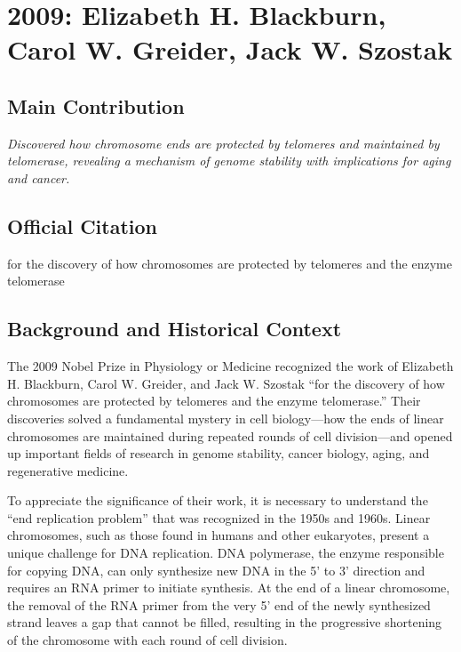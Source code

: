 \chapter[2009 --- Blackburn et al.]{2009: Elizabeth H. Blackburn, Carol W. Greider, Jack W. Szostak}
\label{ch:2009_Blackburn}

\section*{Main Contribution}

\textit{Discovered how chromosome ends are protected by telomeres and maintained by telomerase, revealing a mechanism of genome stability with implications for aging and cancer.}\cite{nobel-2009,lecture-2009}

\section{Official Citation}

for the discovery of how chromosomes are protected by telomeres and the enzyme telomerase

\section{Background and Historical Context}

The 2009 Nobel Prize in Physiology or Medicine recognized the work of Elizabeth H. Blackburn, Carol W. Greider, and Jack W. Szostak ``for the discovery of how chromosomes are protected by telomeres and the enzyme telomerase.'' Their discoveries solved a fundamental mystery in cell biology---how the ends of linear chromosomes are maintained during repeated rounds of cell division---and opened up important fields of research in genome stability, cancer biology, aging, and regenerative medicine.

To appreciate the significance of their work, it is necessary to understand the ``end replication problem'' that was recognized in the 1950s and 1960s. Linear chromosomes, such as those found in humans and other eukaryotes, present a unique challenge for DNA replication. DNA polymerase, the enzyme responsible for copying DNA, can only synthesize new DNA in the 5' to 3' direction and requires an RNA primer to initiate synthesis. At the end of a linear chromosome, the removal of the RNA primer from the very 5' end of the newly synthesized strand leaves a gap that cannot be filled, resulting in the progressive shortening of the chromosome with each round of cell division.

